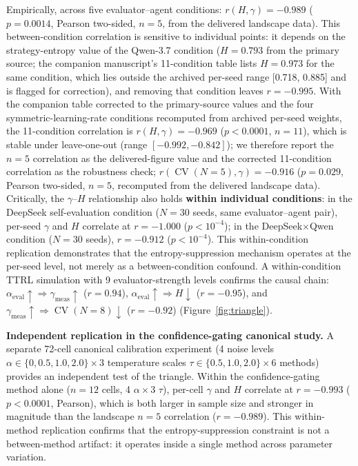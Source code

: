 \documentclass[11pt]{article}
\DeclareMathOperator{\CV}{CV}
\begin{document}
Empirically, across five evaluator--agent conditions: $r(H, \gamma) = -0.989$ ($p = 0.0014$, Pearson two-sided, $n{=}5$, from the delivered landscape data). This between-condition correlation is sensitive to individual points: it depends on the strategy-entropy value of the Qwen-3.7 condition ($H{=}0.793$ from the primary source; the companion manuscript's 11-condition table lists $H{=}0.973$ for the same condition, which lies outside the archived per-seed range [0.718, 0.885] and is flagged for correction), and removing that condition leaves $r = -0.995$. With the companion table corrected to the primary-source values and the four symmetric-learning-rate conditions recomputed from archived per-seed weights, the 11-condition correlation is $r(H, \gamma) = -0.969$ ($p < 0.0001$, $n{=}11$), which is stable under leave-one-out (range $[-0.992, -0.842]$); we therefore report the $n{=}5$ correlation as the delivered-figure value and the corrected 11-condition correlation as the robustness check; $r(\CV(N{=}5), \gamma) = -0.916$ ($p = 0.029$, Pearson two-sided, $n{=}5$, recomputed from the delivered landscape data). Critically, the $\gamma$--$H$ relationship also holds \textbf{within individual conditions}: in the DeepSeek self-evaluation condition ($N{=}30$ seeds, same evaluator--agent pair), per-seed $\gamma$ and $H$ correlate at $r = -1.000$ ($p < 10^{-4}$); in the DeepSeek$\times$Qwen condition ($N{=}30$ seeds), $r = -0.912$ ($p < 10^{-4}$). This within-condition replication demonstrates that the entropy-suppression mechanism operates at the per-seed level, not merely as a between-condition confound. A within-condition TTRL simulation with 9 evaluator-strength levels confirms the causal chain: $\alpha_{\text{eval}} \uparrow \Rightarrow \gamma_{\text{meas}} \uparrow$ ($r = 0.94$), $\alpha_{\text{eval}} \uparrow \Rightarrow H \downarrow$ ($r = -0.95$), and $\gamma_{\text{meas}} \uparrow \Rightarrow \CV(N{=}8) \downarrow$ ($r = -0.92$) (Figure~\ref{fig:triangle}).

\textbf{Independent replication in the confidence-gating canonical study.} A separate 72-cell canonical calibration experiment (4 noise levels $\alpha \in \{0, 0.5, 1.0, 2.0\} \times 3$ temperature scales $\tau \in \{0.5, 1.0, 2.0\} \times 6$ methods) provides an independent test of the triangle. Within the confidence-gating method alone ($n{=}12$ cells, 4 $\alpha \times 3$ $\tau$), per-cell $\gamma$ and $H$ correlate at $r = -0.993$ ($p < 0.0001$, Pearson), which is both larger in sample size and stronger in magnitude than the landscape $n{=}5$ correlation ($r = -0.989$). This within-method replication confirms that the entropy-suppression constraint is not a between-method artifact: it operates inside a single method across parameter variation.
\end{document}
